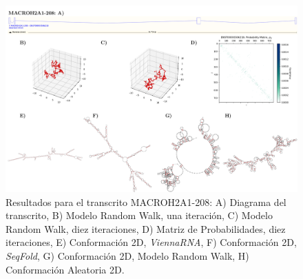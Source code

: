 \documentclass[a4paper,11pt,titlepage]{article}
\theoremstyle{definition}
\begin{document}
\begin{figure}[H]
    \centering
    \includegraphics[width=\textwidth]{images/MACROH2A1-208_full.png}
    \small{\caption{Resultados para el transcrito MACROH2A1-208: A) Diagrama del transcrito, B) Modelo Random Walk, una iteración, C) Modelo Random Walk, diez iteraciones, D) Matriz de Probabilidades, diez iteraciones, E) Conformación 2D, \textit{ViennaRNA}, F) Conformación 2D, \textit{SeqFold}, G) Conformación 2D, Modelo Random Walk, H) Conformación Aleatoria 2D.}\label{fig:MACROH2A1-208-diag}}\normalsize
\end{figure}
\end{document}
